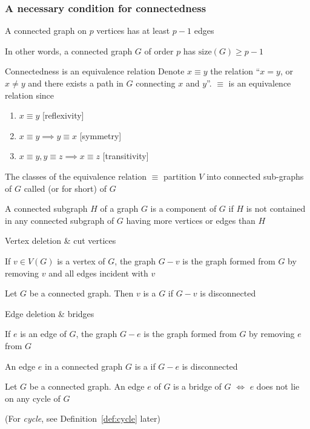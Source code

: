 \documentclass[aspectratio=169]{beamer}\usepackage[]{graphicx}\usepackage[]{xcolor}
\begin{document}
\begin{frame}\frametitle{A necessary condition for connectedness}
	\begin{theorem}
		A connected graph on $p$ vertices has at least $p-1$ edges
	\end{theorem}
	\vfill
	In other words, a connected graph $G$ of order $p$ has $\text{size}(G)\geq p-1$
\end{frame}

\begin{frame}{Connectedness is an equivalence relation}
	Denote $x\equiv y$ the relation  ``$x=y$, or $x\neq y$ and there exists a path in $G$ connecting $x$ and $y$''. $\equiv$ is an equivalence relation since
	\begin{enumerate}
		\item $x\equiv y$ \hfill[reflexivity]
		\item $x\equiv y\implies y\equiv x$ \hfill[symmetry]
		\item $x\equiv y, y\equiv z\implies x\equiv z$ \hfill[transitivity]
	\end{enumerate}
	\vfill
	\begin{definition}
		The classes of the equivalence relation $\equiv$ partition $V$ into connected sub-graphs of $G$ called  (or  for short) of $G$
	\end{definition}
	\vfill
	A connected subgraph $H$ of a graph $G$ is a component of $G$ if $H$ is not contained in any connected subgraph of $G$ having more vertices or edges than $H$
\end{frame}



\begin{frame}{Vertex deletion \& cut vertices}
\begin{definition}
If $v\in V(G)$ is a vertex of $G$, the graph $G-v$ is the graph formed from $G$ by removing $v$ and all edges incident with $v$
\end{definition}
\vfill
\begin{definition}
	Let $G$ be a connected graph. Then $v$ is a  $G$ if $G-v$ is disconnected
\end{definition}
\end{frame}


\begin{frame}{Edge deletion \& bridges}
\begin{definition}
	If $e$ is an edge of $G$, the graph $G-e$ is the graph formed from $G$ by removing $e$ from $G$
\end{definition}
\vfill
\begin{definition}[{Bridge}]
An edge $e$ in a connected graph $G$ is a  if $G-e$ is disconnected
\end{definition}
\vfill
\begin{theorem}
Let $G$ be a connected graph. An edge $e$ of $G$ is a bridge of $G$ $\iff$ $e$ does not lie on any cycle of $G$
\end{theorem}
(For \emph{cycle}, see Definition~\ref{def:cycle} later)
\end{frame}
\end{document}
